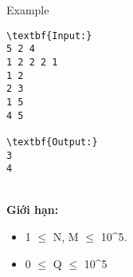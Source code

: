 Example
\begin{verbatim}
\textbf{Input:}
5 2 4
1 2 2 2 1
1 2
2 3
1 5
4 5

\textbf{Output:}
3
4\end{verbatim}
\\\textbf{Giới hạn:} 
\begin{itemize}
	\item 1  $\le$  N, M  $\le$  10^5.
	\item 0  $\le$  Q  $\le$  10^5
\end{itemize}